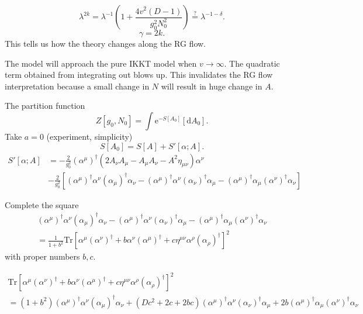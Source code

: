 \[
	\lambda^{2k} = \lambda^{-1} \left( 1 + \frac{4v^2(D-1)}{g_0^2 N_0^2} \right) 
	\stackrel{?}{=} \lambda^{-1-\delta}
.\] 
\[
\gamma = 2 k
.\] 
This tells us how the theory changes along the RG flow.

The model will approach the pure IKKT model when $v\to\infty$.
The quadratic term obtained from integrating out blows up.
This invalidates the RG flow interpretation
because a small change in $N$ will result in huge change in $A$.

The partition function
\[
	Z[g_0,N_0] = \int \mathrm{e}^{-S[A_0]} [\mathrm{d}A_0]
.\] 
Take $a=0$ (experiment, simplicity)
\[
	S[A_0] = S[A] + S'[\alpha;A]
.\] 
\begin{align*}
	S'[\alpha;A] &= - \frac{2}{g_0^2} (\alpha^\mu)^\dagger
	(2 A_\nu A_\mu - A_\mu A_\nu - A^2 \eta_{\mu\nu}) \alpha^\nu \\
				 &- \frac{2}{g_0^2} \left[ (\alpha^\mu)^\dagger \alpha^\nu
	(\alpha_\mu)^\dagger \alpha_\nu - (\alpha^\mu)^\dagger \alpha^\nu
(\alpha_\nu)^\dagger \alpha_\mu - (\alpha^\mu)^\dagger \alpha_\mu
(\alpha^\nu)^\dagger \alpha_\nu\right] 
\end{align*}

Complete the square
\begin{align*}
	 (\alpha^\mu)^\dagger \alpha^\nu
	(\alpha_\mu)^\dagger \alpha_\nu - (\alpha^\mu)^\dagger \alpha^\nu
(\alpha_\nu)^\dagger \alpha_\mu - (\alpha^\mu)^\dagger \alpha_\mu
(\alpha^\nu)^\dagger \alpha_\nu \\
= \frac{1}{1+b^2} \mathrm{Tr} \left[ \alpha^\mu (\alpha^\nu)^\dagger
+ b \alpha^\nu (\alpha^\mu)^\dagger + c \eta^{\mu\nu} \alpha^\rho (\alpha_\rho)^\dagger\right] ^2
\end{align*}
with proper numbers $b,c$.

\begin{gather*}
	\mathrm{Tr}[\alpha^\mu (\alpha^\nu)^\dagger + b \alpha^\nu (\alpha^\mu)^\dagger + c \eta^{\mu\nu} \alpha^\rho (\alpha_{\rho})^\dagger]^2
	\\=
	(1+b^2)(\alpha^\mu)^\dagger \alpha^\nu (\alpha_\mu)^\dagger \alpha_\nu
	+(Dc^2 + 2c + 2bc)(\alpha^\mu)^\dagger \alpha^\nu (\alpha_\nu)^\dagger
	\alpha_\mu + 2b (\alpha^\mu)^\dagger \alpha_\mu (\alpha^\nu)^\dagger \alpha_\nu
\end{gather*}

